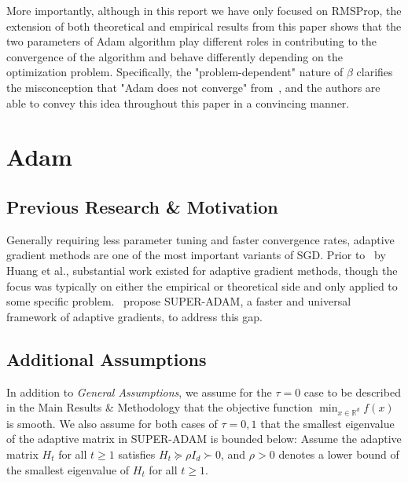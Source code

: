 \documentclass{article}
\begin{document}
More importantly, although in this report we have only focused on RMSProp, the extension of both theoretical and empirical results from this paper shows that the two parameters of Adam algorithm play different roles in contributing to the convergence of the algorithm and behave differently depending on the optimization problem. Specifically, the "problem-dependent" nature of $\beta$ clarifies the misconception that "Adam does not converge" from~\cite{https://doi.org/10.48550/arxiv.1904.09237}, and the authors are able to convey this idea throughout this paper in a convincing manner.
\section{Adam}
\label{section7}
\subsection{Previous Research \& Motivation}
Generally requiring less parameter tuning and faster convergence rates, adaptive gradient methods are one of the most important variants of SGD. Prior to~\cite{https://doi.org/10.48550/arxiv.2106.08208} by Huang et al., substantial work existed for adaptive gradient methods, though the focus was typically
on either the empirical or theoretical side and only applied to some specific problem.~\cite{https://doi.org/10.48550/arxiv.2106.08208} propose SUPER-ADAM, a faster and universal framework of adaptive gradients, to address this gap.
\subsection{Additional Assumptions}
In addition to \textit{General Assumptions}, we assume for the $\tau = 0$ case to be described in the Main Results \& Methodology that the objective function $\min_{x \in \mathbb{R}^d} f(x)$ is smooth. We also assume for both cases of $\tau=0,1$ that the smallest eigenvalue of the adaptive matrix
in SUPER-ADAM is bounded below: Assume the adaptive matrix $H_t$ for all $t\geq 1$ satisfies $H_t \succeq \rho I_d\succ 0$, and $\rho > 0$ denotes a lower bound of the smallest eigenvalue of $H_t$ for all $t\geq 1$.
\end{document}
